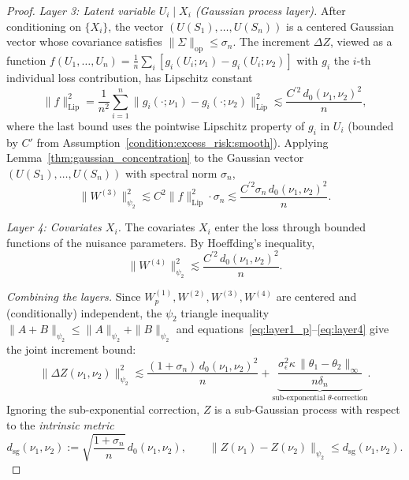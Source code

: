 \begin{proof}
\noindent\textit{Layer 3: Latent variable $U_i\mid X_i$ (Gaussian process layer).}
After conditioning on $\{X_i\}$, the vector $(U(S_1),\ldots,U(S_n))$ is a centered Gaussian vector whose covariance satisfies $\|\Sigma\|_{\mathrm{op}}\leq\sigma_n$. The increment $\Delta Z$, viewed as a function $f(U_1,\ldots,U_n)=\frac{1}{n}\sum_i [g_i(U_i;\nu_1)-g_i(U_i;\nu_2)]$ with $g_i$ the $i$-th individual loss contribution, has Lipschitz constant
$$\|f\|_{\mathrm{Lip}}^2 = \frac{1}{n^2}\sum_{i=1}^n\bigl\|g_i(\cdot;\nu_1)-g_i(\cdot;\nu_2)\bigr\|_{\mathrm{Lip}}^2 \lesssim \frac{C^{\prime2}\,d_0(\nu_1,\nu_2)^2}{n},$$
where the last bound uses the pointwise Lipschitz property of $g_i$ in $U_i$ (bounded by $C'$ from Assumption~\ref{condition:excess_risk:smooth}). Applying Lemma~\ref{thm:gaussian_concentration} to the Gaussian vector $(U(S_1),\ldots,U(S_n))$ with spectral norm $\sigma_n$,
\begin{equation}\label{eq:layer3}
\bigl\|W^{(3)}\bigr\|_{\psi_2}^2 \lesssim C^2\|f\|_{\mathrm{Lip}}^2\cdot\sigma_n \lesssim \frac{C^{\prime2}\sigma_n\,d_0(\nu_1,\nu_2)^2}{n}.
\end{equation}

\noindent\textit{Layer 4: Covariates $X_i$.}
The covariates $X_i$ enter the loss through bounded functions of the nuisance parameters. By Hoeffding's inequality,
\begin{equation}\label{eq:layer4}
\bigl\|W^{(4)}\bigr\|_{\psi_2}^2 \lesssim \frac{C^{\prime2}\,d_0(\nu_1,\nu_2)^2}{n}.
\end{equation}

\noindent\textit{Combining the layers.}
Since $W^{(1)}_p, W^{(2)}, W^{(3)}, W^{(4)}$ are centered and (conditionally) independent, the $\psi_2$ triangle inequality $\|A+B\|_{\psi_2}\leq\|A\|_{\psi_2}+\|B\|_{\psi_2}$ and equations~\eqref{eq:layer1_p}--\eqref{eq:layer4} give the joint increment bound:
\begin{equation}\label{eq:sg_increment}
\bigl\|\Delta Z(\nu_1,\nu_2)\bigr\|_{\psi_2}^2 \lesssim \frac{(1+\sigma_n)\,d_0(\nu_1,\nu_2)^2}{n} + \underbrace{\frac{\sigma_\epsilon^2\kappa\,\|\theta_1-\theta_2\|_\infty}{n\delta_n}}_{\text{sub-exponential }\theta\text{-correction}}.
\end{equation}
Ignoring the sub-exponential correction, $Z$ is a sub-Gaussian process with respect to the \emph{intrinsic metric}
\begin{equation}\label{eq:intrinsic_metric}
d_{\mathrm{sg}}(\nu_1,\nu_2) := \sqrt{\frac{1+\sigma_n}{n}}\,d_0(\nu_1,\nu_2),\qquad \|Z(\nu_1)-Z(\nu_2)\|_{\psi_2}\leq d_{\mathrm{sg}}(\nu_1,\nu_2).
\end{equation}


\end{proof}
